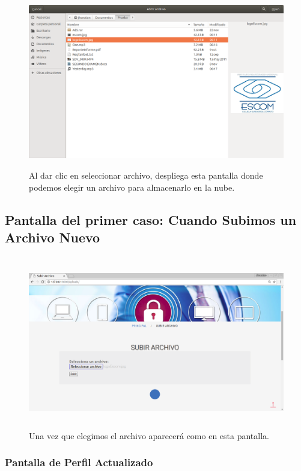 			\begin{figure}[H]
			\centering
			\includegraphics[width=14cm, height=7.5cm]{./images/Implementacion/PantallaElegirArchivoSubir.png}
			\caption{Al dar clic en seleccionar archivo, despliega esta pantalla donde podemos elegir un archivo para almacenarlo en la nube.}
			\label{fig:6-1-11} 
			\end{figure}

\subsection{Pantalla del primer caso: Cuando Subimos un Archivo Nuevo}

			\begin{figure}[H]
			\centering
			\includegraphics[width=14cm, height=7.5cm]{./images/Implementacion/PantallaSubirArchivoNuevo.png}
			\caption{Una vez que elegimos el archivo aparecerá como en esta pantalla.}
			\label{fig:6-1-12} 
			\end{figure}

\subsubsection{Pantalla de Perfil Actualizado}

